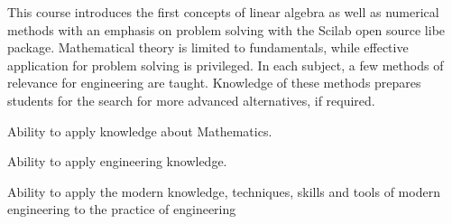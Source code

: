 \begin{syllabus}


\begin{justification}
This course introduces the first concepts of linear algebra as well as numerical methods with an emphasis on problem solving with the Scilab open source libe package.
Mathematical theory is limited to fundamentals, while effective application for problem solving is privileged.
In each subject, a few methods of relevance for engineering are taught. Knowledge of these methods prepares students for the search for more advanced alternatives, if required.


\end{justification}

\begin{goals}
\item Ability to apply knowledge about Mathematics.
\item Ability to apply engineering knowledge.
\item Ability to apply the modern knowledge, techniques, skills and tools of modern engineering to the practice of engineering
 

\end{goals}

\begin{outcomes}
    \item {}
    \item {}
\end{outcomes}

\begin{competences}
    \item {} 
    \item {} 
    \item {} 
\end{competences}


\end{syllabus}
